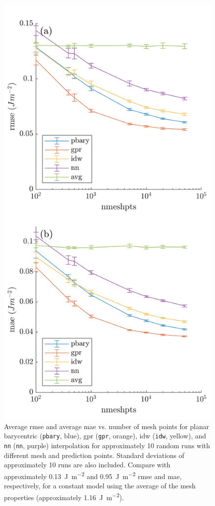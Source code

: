 \documentclass[preprint,12pt]{elsarticle}
\begin{document}
\begin{figure}
    \centering
    \includegraphics[width=0.5\linewidth]{brkerror.png}
    \caption{Average \gls{rmse} and average \gls{mae} vs. number of mesh points for planar barycentric (\texttt{pbary}, blue), \gls{gpr} (\texttt{gpr}, orange), \gls{idw} (\texttt{idw}, yellow), and \texttt{nn} (\texttt{nn}, purple) interpolation for approximately 10 random runs with different mesh and prediction points. Standard deviations of approximately 10 runs are also included. Compare with approximately \SI{0.13}{\J\per\square\meter} and \SI{0.95}{\J\per\square\meter} \gls{rmse} and \gls{mae}, respectively, for a constant model using the average of the mesh properties (approximately \SI{1.16}{\J\per\square\meter}).}
    \label{fig:brkerror}
\end{figure}
\end{document}
